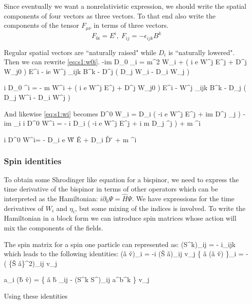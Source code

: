 Since eventually we want a nonrelativistic expression, we should write the spatial components of four vectors as three vectors.  To that end also write the components of the tensor $F_{\mu\nu}$ in terms of three vectors.
$$ F_{0i} = E^i , \; F_{ij} = -\epsilon_{ijk} B^k $$

Regular spatial vectors are ``naturally raised" while $D_i$ is ``naturally lowered".  Then we can rewrite \eqref{eq:s1:w0i}.
\beq
	-im D_0 \eta_i =  m^2 W_i  +  \left( i e \lambda W^j E^j + D^j W_{j0} \right ) E^i
	- ie \lambda W^j \epsilon_{ijk} B^k - D^j (  D_j W_i - D_i W_j )
\eeq

\beq
	i D_0 \eta^i = - m W^i  +  \left( i e \lambda W^j E^j + D^j W_{j0} \right ) E^i
	-  W^j \epsilon_{ijk} B^k - D_j (  D_j W^i - D_i W^j )
\eeq

And likewise \eqref{eq:s1:wi} becomes
\beq
		D^0 W_i = D_i \left( -i e \lambda W^j E^j + im  D^j \eta_j \right )  - im \eta_i
\eeq
\beq
		i D^0 W^i = - i D_i \left( -i e \lambda W^j E^j + i m  D_j \eta^j \right )  + m \eta^i
\eeq

\beq
	i D^0 W^i= - D_i  e \lambda \v{W} \cdot \v{E} +  D_i \v{D} \cdot \v{\eta} + m \eta^i
\eeq

\subsubsection{Spin identities}
To obtain some Shrodinger like equation for a bispinor, we need to express the time derivative of the bispinor in terms of other operators which can be interpreted as the Hamiltonian: $i \partial_0 \Psi = \hat{H} \Psi$.  We have expressions for the time derivatives of $W_i$ and $\eta_i$, but some mixing of the indices is involved.  To write the Hamiltonian in a block form we can introduce spin matrices whose action will mix the components of the fields.

The spin matrix for a spin one particle can represented as:
\beq
	(S^k)_{ij} = - i\epsilon_{ijk}
\eeq
which leads to the following identities:
\beq
	(\v{a} \times \v{v})_i = -i (\v{S} \cdot \v{a})_{ij} v_j
\eeq
\beq
	\{ \v{a} \times (\v{a} \times \v{v}) \}_i = - ( \{\v{S} \cdot \v{a}\}^2)_{ij} v_j
\eeq

\beq
	a_i (\v{b} \cdot \v{v}) = \{ \v{a} \cdot \v{b} \; \delta_{ij} - (S^k S^\ell)_{ij} a^\ell b^k \} v_j
\eeq

Using these identities

